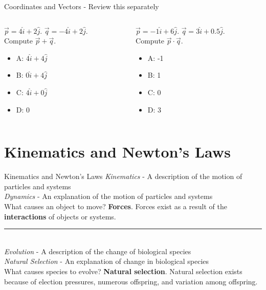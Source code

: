 \documentclass{beamer}
\begin{document}
\begin{frame}{Coordinates and Vectors - Review this separately}
\small
\begin{columns}[T]
\begin{column}{0.5\textwidth}
$\vec{p} = 4\hat{i}+2\hat{j}$.  $\vec{q} = -4\hat{i}+2\hat{j}$.  \\
Compute $\vec{p} + \vec{q}$.
\vspace{0.2cm}
\begin{itemize}
\item A: $4\hat{i}+4\hat{j}$
\item B: $0\hat{i}+4\hat{j}$
\item C: $4\hat{i}+0\hat{j}$
\item D: 0
\end{itemize}
\end{column}
\begin{column}{0.5\textwidth}
$\vec{p} = -1\hat{i}+6\hat{j}$.  $\vec{q} = 3\hat{i}+0.5\hat{j}$.  \\
Compute $\vec{p} \cdot \vec{q}$.
\vspace{0.2cm}
\begin{itemize}
\item A: -1
\item B: 1
\item C: 0
\item D: 3
\end{itemize}
\end{column}
\end{columns}
\end{frame}

\section{Kinematics and Newton's Laws}

\begin{frame}{Kinematics and Newton's Laws}
\small
\textit{Kinematics} - A \alert{description} of the motion of particles and systems \\
\textit{Dynamics} - An \alert{explanation} of the motion of particles and systems \\
\vspace{0.25cm}
What causes an object to move?  \textbf{Forces}.  Forces exist as a result of the \alert{\textbf{interactions}} of objects or systems.\\
\vspace{0.25cm}
\rule{10cm}{0.4pt} \\
\vspace{0.25cm}
\textit{Evolution} - A \alert{description} of the change of biological species \\
\textit{Natural Selection} - An \alert{explanation} of change in biological species \\
\vspace{0.25cm}
What causes species to evolve?  \textbf{Natural selection}.  Natural selection exists because of \alert{election pressures}, \alert{numerous offspring}, and \alert{variation} among offspring.
\end{frame}
\end{document}
